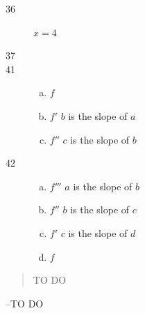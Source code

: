 \documentclass[letterpaper, landscape]{exam}
\begin{document}
\begin{description}
      \item[36] $x = 4$

      \item[37] 

      \item[41] 
        \begin{enumerate}[(a)]
          \item $f$
          \item $f'$ $b$ is the slope of $a$
          \item $f''$ $c$ is the slope of $b$
        \end{enumerate}

      \item[42] 
        \begin{enumerate}[(a)]
          \item $f'''$ $a$ is the slope of $b$
          \item $f''$ $b$ is the slope of $c$
          \item $f'$ $c$ is the slope of $d$
          \item $f$ 
        \end{enumerate}
     \end{description}
 
 
  \else
    \vspace{10 cm}
    \begin{quote}
      \begin{em}
        TO DO
      \end{em}
    \end{quote}
    \hspace{2 cm} --TO DO
  \fi
\end{document}
